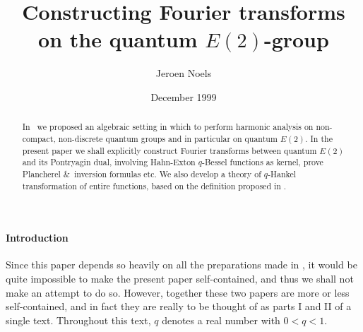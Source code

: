 \title{Constructing Fourier transforms \\ on the quantum $E(2)$-group}
\author{Jeroen Noels}
\date{December 1999}
\maketitle

\begin{abstract}
\noindent
In \cite{Jeroen:QE2:haar}\ we proposed an algebraic setting in which to
perform harmonic analysis on non-compact, non-discrete quantum groups and
in particular on quantum $E(2)$.
In the present paper we shall explicitly construct Fourier transforms between quantum $E(2)$
and its Pontryagin dual, involving Hahn-Exton \mbox{$q$-Bessel} functions as
kernel, prove Plancherel \&\ inversion formulas etc.
We also develop a theory of $q$-Hankel transformation of entire functions,
based on the definition proposed in \cite{KoornwSwartt}\@.
\end{abstract}


\paragraph{Introduction}
Since this paper depends so heavily on all the preparations made
in \cite{Jeroen:QE2:haar}, it would be quite impossible to make
the present paper self-contained, and thus we shall not make an
attempt to do so. However, together these two papers are more or
less self-contained, and in fact they are really to be thought of
as parts I and II of a single text. Throughout this text, $q$
denotes a real number with \mbox{$0<q<1$}.
